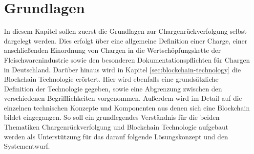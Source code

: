 \section{Grundlagen} \label{sec:basics}
In diesem Kapitel sollen zuerst die Grundlagen zur Chargenrückverfolgung selbst dargelegt werden. Dies erfolgt über eine allgemeine Definition einer Charge, einer anschließenden Einordnung von Chargen in die Wertschöpfungskette der Fleischwarenindustrie sowie den besonderen Dokumentationspflichten für Chargen in Deutschland. Darüber hinaus wird in Kapitel \ref{sec:blockchain-technology} die Blockchain Technologie erörtert. Hier wird ebenfalls eine grundsätzliche Definition der Technologie gegeben, sowie eine Abgrenzung zwischen den verschiedenen Begrifflichkeiten vorgenommen. Außerdem wird im Detail auf die einzelnen technischen Konzepte und Komponenten aus denen sich eine Blockchain bildet eingegangen. So soll ein grundlegendes Verständnis für die beiden Thematiken Chargenrückverfolgung und Blockchain Technologie aufgebaut werden als Unterstützung für das darauf folgende Lösungskonzept und den Systementwurf.





\newpage
